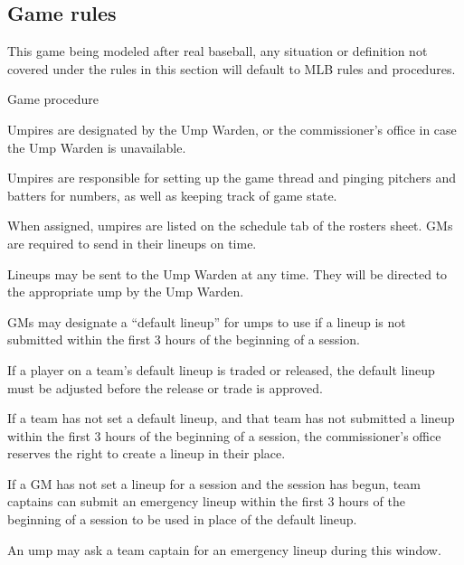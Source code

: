 
\subsection{Game rules}
\begin{deepEnumerate}
	\item This game being modeled after real baseball, 
	any situation or definition not covered under the rules in this section 
	will default to MLB rules and procedures.
	\item Game procedure
	\begin{deepEnumerate}
		\item Umpires are designated by the Ump Warden, 
		or the commissioner’s office in case the Ump Warden is unavailable.
		\begin{deepEnumerate}
			\item Umpires are responsible for setting up the game thread 
			and pinging pitchers and batters for numbers, 
			as well as keeping track of game state.
			\item When assigned, umpires are listed on the schedule tab of the rosters sheet. 
			GMs are required to send in their lineups on time.
			\begin{deepEnumerate}
				\item Lineups may be sent to the Ump Warden at any time. 
				They will be directed to the appropriate ump by the Ump Warden.
				\item GMs may designate a “default lineup” for umps to use 
				if a lineup is not submitted within the first 3 hours of the beginning of a session.
				\begin{deepEnumerate}
					\item If a player on a team’s default lineup is traded or released, 
					the default lineup must be adjusted before the release or trade is approved.
					\item If a team has not set a default lineup, 
					and that team has not submitted a lineup within the first 3 hours of the beginning of a session, 
					the commissioner’s office reserves the right to create a lineup in their place.
					\item If a GM has not set a lineup for a session and the session has begun, 
					team captains can submit an emergency lineup within the first 3 hours of the beginning of a session 
					to be used in place of the default lineup.
					\begin{deepEnumerate}
						\item An ump may ask a team captain for an emergency lineup during this window.

\end{deepEnumerate}
\end{deepEnumerate}
\end{deepEnumerate}
\end{deepEnumerate}
\end{deepEnumerate}
\end{deepEnumerate}
